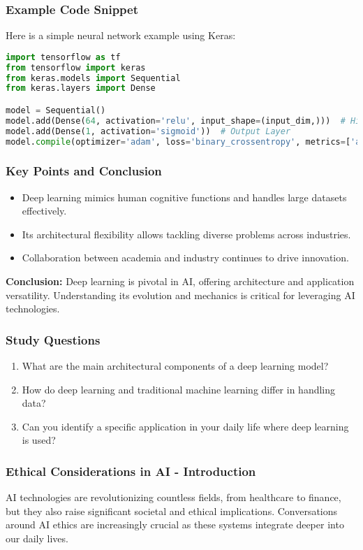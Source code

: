 \documentclass[aspectratio=169]{beamer}
\begin{document}
\begin{frame}[fragile]
    \frametitle{Example Code Snippet}
    Here is a simple neural network example using Keras:
    \begin{lstlisting}[language=Python]
import tensorflow as tf
from tensorflow import keras
from keras.models import Sequential
from keras.layers import Dense

model = Sequential()
model.add(Dense(64, activation='relu', input_shape=(input_dim,)))  # Hidden Layer
model.add(Dense(1, activation='sigmoid'))  # Output Layer
model.compile(optimizer='adam', loss='binary_crossentropy', metrics=['accuracy'])
    \end{lstlisting}
\end{frame}

\begin{frame}[fragile]
    \frametitle{Key Points and Conclusion}
    \begin{itemize}
        \item Deep learning mimics human cognitive functions and handles large datasets effectively.
        \item Its architectural flexibility allows tackling diverse problems across industries.
        \item Collaboration between academia and industry continues to drive innovation.
    \end{itemize}
    \textbf{Conclusion:} Deep learning is pivotal in AI, offering architecture and application versatility. Understanding its evolution and mechanics is critical for leveraging AI technologies.
\end{frame}

\begin{frame}[fragile]
    \frametitle{Study Questions}
    \begin{enumerate}
        \item What are the main architectural components of a deep learning model?
        \item How do deep learning and traditional machine learning differ in handling data?
        \item Can you identify a specific application in your daily life where deep learning is used?
    \end{enumerate}
\end{frame}

\begin{frame}[fragile]
    \frametitle{Ethical Considerations in AI - Introduction}
    AI technologies are revolutionizing countless fields, from healthcare to finance, but they also raise significant societal and ethical implications. 
    Conversations around AI ethics are increasingly crucial as these systems integrate deeper into our daily lives.
\end{frame}
\end{document}
